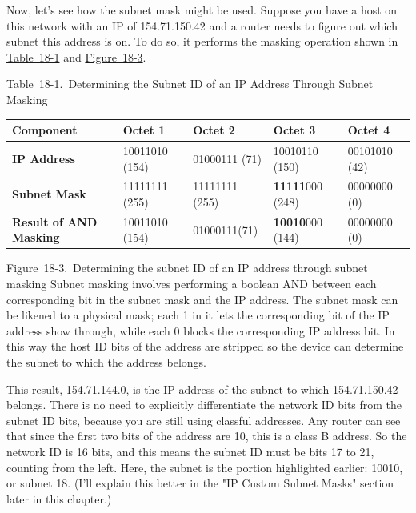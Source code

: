\documentclass[b5paper,11pt]{memoir}
\begin{document}
Now, let's see how the subnet mask might be used. Suppose you have a
host on this network with an IP of 154.71.150.42 and a router needs to
figure out which subnet this address is on. To do so, it performs the
masking operation shown in
\protect\hyperlink{ch18s03.htmlux5cux23determining_the_subnet_id_of_an_ip_addre}{Table~18-1}
and
\protect\hyperlink{ch18s03.htmlux5cux23determining_the_subnet_id_of_an_ip-id001}{Figure~18-3}.

\protect\hypertarget{ch18s03.htmlux5cux23determining_the_subnet_id_of_an_ip_addre}{}{}

Table~18-1.~Determining the Subnet ID of an IP Address Through Subnet
Masking

\begin{longtable}[]{@{}lllll@{}}
\toprule
Component & Octet 1 & Octet 2 & Octet 3 & Octet 4\tabularnewline
\midrule
\endhead
{\textbf{IP Address}} & 10011010 (154) & 01000111 (71) & 10010110 (150)
& 00101010 (42)\tabularnewline
{\textbf{Subnet Mask}} & 11111111 (255) & 11111111 (255) &
{\textbf{11111}}000 (248) & 00000000 (0)\tabularnewline
{\textbf{Result of AND Masking}} & 10011010 (154) & 01000111(71) &
{\textbf{10010}}000 (144) & 00000000 (0)\tabularnewline
\bottomrule
\end{longtable}

\protect\hypertarget{ch18s03.htmlux5cux23determining_the_subnet_id_of_an_ip-id001}{}{}

\protect\hypertarget{ch18s03.htmlux5cux23I_mediaobject4_d1e18373}{}{}

Figure~18-3.~Determining the subnet ID of an IP address through subnet
masking Subnet masking involves performing a boolean AND between each
corresponding bit in the subnet mask and the IP address. The subnet mask
can be likened to a physical mask; each 1 in it lets the corresponding
bit of the IP address show through, while each 0 blocks the
corresponding IP address bit. In this way the host ID bits of the
address are stripped so the device can determine the subnet to which the
address belongs.

This result, 154.71.144.0, is the IP address of the subnet to which
154.71.150.42 belongs. There is no need to explicitly differentiate the
network \protect\hypertarget{ch18s03.htmlux5cux23idx-CHP-18-0726}{}{}ID
bits from the subnet ID bits, because you are still using classful
addresses. Any router can see that since the first two bits of the
address are 10, this is a class B address. So the network ID is 16 bits,
and this means the subnet ID must be bits 17 to 21, counting from the
left. Here, the subnet is the portion highlighted earlier: 10010, or
subnet 18. (I'll explain this better in the "IP Custom Subnet Masks"
section later in this chapter.)
\end{document}
